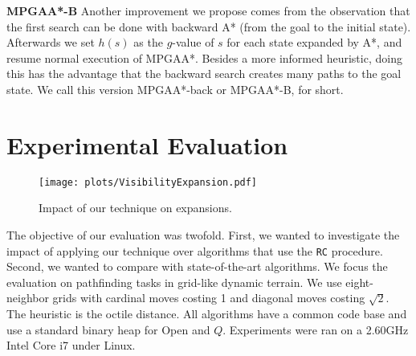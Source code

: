 \documentclass{article}
\begin{document}
\noindent
\textbf{MPGAA*-B} Another improvement we propose comes from the observation that the first search can be done with backward A* (from the goal to the initial state). Afterwards we set $h(s)$ as the $g$-value of $s$ for each state expanded by A*, and resume normal execution of MPGAA*. Besides a more informed heuristic, doing this has the advantage that the backward search creates many paths to the goal state. We call this version MPGAA*-back or MPGAA*-B, for short.



\section{Experimental Evaluation}













\begin{figure}\centering
  \texttt{[image: plots/VisibilityExpansion.pdf]}
 \caption{Impact of our technique on expansions.}\label{fig:expansions}
\end{figure}


The objective of our evaluation was twofold. First, we wanted to investigate the impact of applying our technique over algorithms that use the \texttt{RC} procedure. Second, we wanted to compare with state-of-the-art algorithms. We focus the evaluation on pathfinding tasks in grid-like dynamic terrain. We use eight-neighbor grids with cardinal moves costing 1 and diagonal moves costing $\sqrt{2}$. The heuristic is the octile distance. All algorithms have a common code base and use a standard binary heap for Open and $Q$. Experiments were ran on a 2.60GHz Intel Core i7 under Linux.
\end{document}
